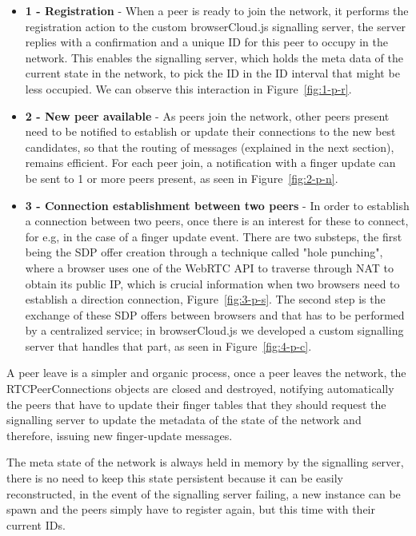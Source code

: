 \begin{itemize}
    \item \textbf{1 - Registration} - When a peer is ready to join the network, it performs the registration action to the custom browserCloud.js signalling server, the server replies with a confirmation and a unique ID for this peer to occupy in the network. This enables the signalling server, which holds the meta data of the current state in the network, to pick the ID in the ID interval that might be less occupied. We can observe this interaction in Figure~\ref{fig:1-p-r}.
    \item \textbf{2 - New peer available} - As peers join the network, other peers present need to be notified to establish or update their connections to the new best candidates, so that the routing of messages (explained in the next section), remains efficient. For each peer join, a notification with a finger update can be sent to 1 or more peers present, as seen in Figure~\ref{fig:2-p-n}.
    \item \textbf{3 - Connection establishment between two peers} - In order to establish a connection between two peers, once there is an interest for these to connect, for e.g, in the case of a finger update event. There are two substeps, the first being the SDP offer creation through a technique called "hole punching", where a browser uses one of the WebRTC API to traverse through NAT to obtain its public IP, which is crucial information when two browsers need to establish a direction connection, Figure~\ref{fig:3-p-s}. The second step is the exchange of these SDP offers between browsers and that has to be performed by a centralized service; in browserCloud.js we developed a custom signalling server that handles that part, as seen in Figure~\ref{fig:4-p-c}.
\end{itemize}

A peer leave is a simpler and organic process, once a peer leaves the network, the RTCPeerConnections objects are closed and destroyed, notifying automatically the peers that have to update their finger tables that they should request the signalling server to update the metadata of the state of the network and therefore, issuing new finger-update messages.

The meta state of the network is always held in memory by the signalling server, there is no need to keep this state persistent because it can be easily reconstructed, in the event of the signalling server failing, a new instance can be spawn and the peers simply have to register again, but this time with their current IDs.

